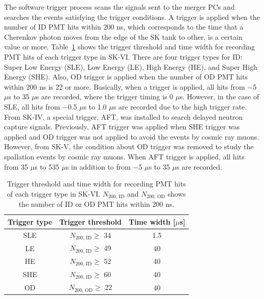 \hs The software trigger process scans the signals sent to the merger PCs and searches the events satisfying the trigger conditions.
A trigger is applied when the number of ID PMT hits within 200 ns, which corresponds to the time that a Cherenkov photon moves from the edge of the SK tank to other, is a certain value or more.
Table~\ref{002_Tab:Tri} shows the trigger threshold and time width for recording PMT hits of each trigger type in SK-VI.
There are four trigger types for ID: Super Low Energy (SLE), Low Energy (LE), High Energy (HE), and Super High Energy (SHE).
Also, OD trigger is applied when the number of OD PMT hits within 200 ns is 22 or more.
Basically, when a trigger is applied, all hits from $-$5 $\mu$s to 35 $\mu$s are recorded, where the trigger timing is 0 $\mu$s.
However, in the case of SLE, all hits from $-$0.5 $\mu$s to 1.0 $\mu$s are recorded due to the high trigger rate.\\
\hs From SK-IV, a special trigger, AFT, was installed to search delayed neutron capture signals.
Previously, AFT trigger was applied when SHE trigger was applied and OD trigger was not applied to avoid the events by cosmic ray muons.
However, from SK-V, the condition about OD trigger was removed to study the spallation events by cosmic ray muons.
When AFT trigger is applied, all hits from 35 $\mu$s to 535 $\mu$s in addition to from $-$5 $\mu$s to 35 $\mu$s are recorded.

\begin{table}[tbp]
	\caption[Trigger threshold and time width for recording PMT hits of each trigger type in SK-VI]{\label{002_Tab:Tri} Trigger threshold and time width for recording PMT hits of each trigger type in SK-VI. $N_{\text{200, ID}}$ and $N_{\text{200, OD}}$ shows the number of ID or OD PMT hits within 200 ns.}
	\centering
	\vs
	\begin{tabular}{ccc}
		\hline\hline
		Trigger type&Trigger threshold&Time width [$\mu$s]\\
		\hline
		SLE&$N_{\text{200, ID}}\ge$ 34&1.5\\
		LE&$N_{\text{200, ID}}\ge$ 49&40\\
		HE&$N_{\text{200, ID}}\ge$ 52&40\\
		SHE&$N_{\text{200, ID}}\ge$ 60&40\\
		OD&$N_{\text{200, OD}}\ge$ 22&40\\
		\hline\hline
	\end{tabular}
\end{table}


\newpage
